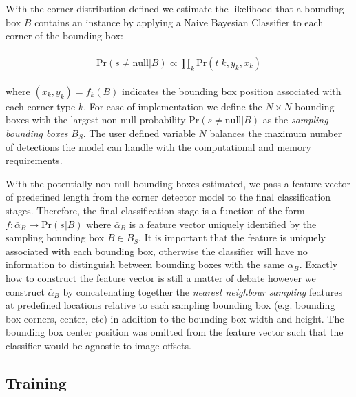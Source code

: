 \documentclass[10pt,twocolumn]{article}
\begin{document}
With the corner distribution defined we estimate the likelihood that a bounding box $B$ contains an instance by applying a Naive Bayesian Classifier to each corner of the bounding box:

\begin{gather}
\label{eq:bbox_bayes}
\begin{split}
\mathrm{Pr}(s \neq \mathrm{null} | B) \propto \prod_k \mathrm{Pr}(t|k,y_k,x_k) 
\end{split}
\end{gather}

where $(x_k,y_k) = f_k(B)$ indicates the bounding box position associated with each corner type $k$. For ease of implementation we define the $N \times N$ bounding boxes 
with the largest non-null probability $\mathrm{Pr}(s \neq \mathrm{null} | B)$ as the \textit{sampling bounding boxes} $B_S$. The user defined variable $N$ balances the maximum number of detections the model can handle with the computational and memory requirements. 

With the potentially non-null bounding boxes estimated, we pass a feature vector of predefined length from the corner detector model to the final classification stages. Therefore, the final classification stage is a function of the form $f:\bar{\alpha}_{B} \rightarrow \mathrm{Pr}(s | B)$ where $\bar{\alpha}_{B}$ is a feature vector uniquely identified by the sampling bounding box $B \in B_S$.  It is important that the feature is uniquely associated with each bounding box, otherwise the classifier will have no information to distinguish between bounding boxes with the same $\bar{\alpha}_B$. Exactly how to construct the feature vector is still a matter of debate\cite{r-fcn,faster-rcnn} however we construct $\bar{\alpha}_{B}$ by concatenating together the \textit{nearest neighbour} \textit{sampling} features at predefined locations relative to each sampling bounding box (e.g. bounding box corners, center, etc) in addition to the bounding box width and height. The bounding box center position was omitted  from the feature vector such that the classifier would be agnostic to image offsets.




\subsection{Training}
\end{document}
